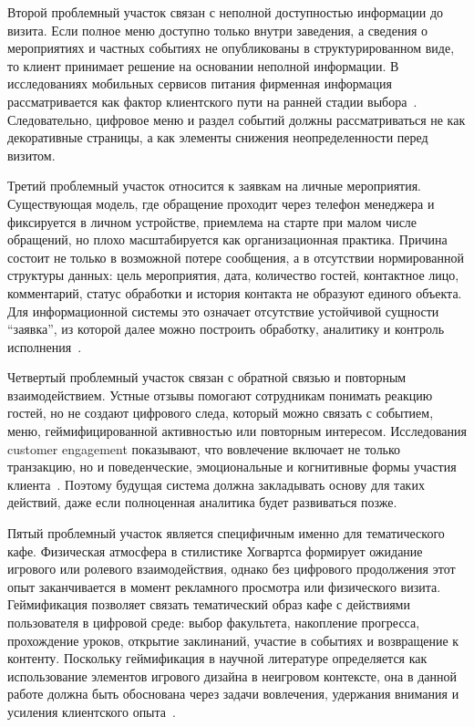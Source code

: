 Второй проблемный участок связан с неполной доступностью информации до визита. Если полное меню доступно только внутри заведения, а сведения о мероприятиях и частных событиях не опубликованы в структурированном виде, то клиент принимает решение на основании неполной информации. В исследованиях мобильных сервисов питания фирменная информация рассматривается как фактор клиентского пути на ранней стадии выбора~\cite{rita2022}. Следовательно, цифровое меню и раздел событий должны рассматриваться не как декоративные страницы, а как элементы снижения неопределенности перед визитом.

Третий проблемный участок относится к заявкам на личные мероприятия. Существующая модель, где обращение проходит через телефон менеджера и фиксируется в личном устройстве, приемлема на старте при малом числе обращений, но плохо масштабируется как организационная практика. Причина состоит не только в возможной потере сообщения, а в отсутствии нормированной структуры данных: цель мероприятия, дата, количество гостей, контактное лицо, комментарий, статус обработки и история контакта не образуют единого объекта. Для информационной системы это означает отсутствие устойчивой сущности ``заявка'', из которой далее можно построить обработку, аналитику и контроль исполнения~\cite{gost34003,utkin_baldin_2003}.

Четвертый проблемный участок связан с обратной связью и повторным взаимодействием. Устные отзывы помогают сотрудникам понимать реакцию гостей, но не создают цифрового следа, который можно связать с событием, меню, геймифицированной активностью или повторным интересом. Исследования customer engagement показывают, что вовлечение включает не только транзакцию, но и поведенческие, эмоциональные и когнитивные формы участия клиента~\cite{pansari2017,behnam2021}. Поэтому будущая система должна закладывать основу для таких действий, даже если полноценная аналитика будет развиваться позже.

Пятый проблемный участок является специфичным именно для тематического кафе. Физическая атмосфера в стилистике Хогвартса формирует ожидание игрового или ролевого взаимодействия, однако без цифрового продолжения этот опыт заканчивается в момент рекламного просмотра или физического визита. Геймификация позволяет связать тематический образ кафе с действиями пользователя в цифровой среде: выбор факультета, накопление прогресса, прохождение уроков, открытие заклинаний, участие в событиях и возвращение к контенту. Поскольку геймификация в научной литературе определяется как использование элементов игрового дизайна в неигровом контексте, она в данной работе должна быть обоснована через задачи вовлечения, удержания внимания и усиления клиентского опыта~\cite{deterding2011,chathoth2016,xu2017,buil2024}.

